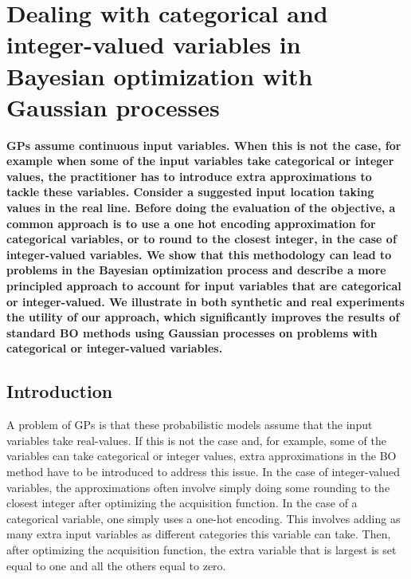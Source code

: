 
\chapter{Dealing with categorical and integer-valued variables in Bayesian optimization with Gaussian processes} %
\label{Chapter6}

{\bf \small{
GPs assume continuous input variables. When this is not the case, for example when some of the input variables take categorical or integer
values, the practitioner has to introduce extra approximations to tackle these variables.
Consider a suggested input location taking values in the real line.
Before doing the evaluation of the objective, a common approach
is to use a one hot encoding approximation for categorical variables, or to round to the closest
integer, in the case of integer-valued variables. We show that this methodology can lead to problems
in the Bayesian optimization process and describe a more principled approach to account for input
variables that are categorical or integer-valued. We illustrate in both synthetic and real
experiments the utility of our approach, which significantly improves the results of
standard BO methods using Gaussian processes on problems with categorical or integer-valued
variables.
}}

\section{Introduction}
A problem of GPs is that these probabilistic models assume that the input variables take
real-values. If this is not the case and, for example, some of the variables can take categorical or integer
values, extra approximations in the BO method have to be introduced to address this issue. In the case of
integer-valued variables, the approximations often involve simply doing some rounding to the closest integer
after optimizing the acquisition function. In the case of a categorical variable, one simply uses a one-hot
encoding. This involves adding as many extra input variables as different categories this variable can take.
Then, after optimizing the acquisition function, the extra variable that is largest is set equal to one and all
the others equal to zero. 

